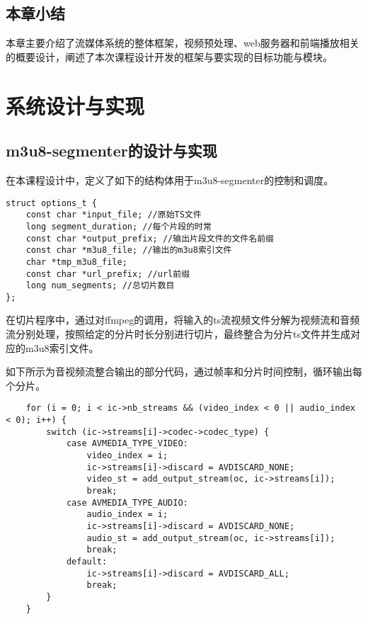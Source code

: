 \documentclass[bachelor]{thesis-uestc}
\begin{document}
\section{本章小结}
本章主要介绍了流媒体系统的整体框架，视频预处理、web服务器和前端播放相关的概要设计，阐述了本次课程设计开发的框架与要实现的目标功能与模块。



\chapter{系统设计与实现}

\section{m3u8-segmenter的设计与实现}

在本课程设计中，定义了如下的结构体用于m3u8-segmenter的控制和调度。

\begin{lstlisting}
struct options_t {
    const char *input_file; //原始TS文件
    long segment_duration; //每个片段的时常
    const char *output_prefix; //输出片段文件的文件名前缀
    const char *m3u8_file; //输出的m3u8索引文件
    char *tmp_m3u8_file; 
    const char *url_prefix; //url前缀
    long num_segments; //总切片数目
};
\end{lstlisting}

\par 在切片程序中，通过对ffmpeg的调用，将输入的ts流视频文件分解为视频流和音频流分别处理，按照给定的分片时长分别进行切片，最终整合为分片ts文件并生成对应的m3u8索引文件。

\par 如下所示为音视频流整合输出的部分代码，通过帧率和分片时间控制，循环输出每个分片。

\begin{lstlisting}
	for (i = 0; i < ic->nb_streams && (video_index < 0 || audio_index < 0); i++) {
        switch (ic->streams[i]->codec->codec_type) {
            case AVMEDIA_TYPE_VIDEO:
                video_index = i;
                ic->streams[i]->discard = AVDISCARD_NONE;
                video_st = add_output_stream(oc, ic->streams[i]);
                break;
            case AVMEDIA_TYPE_AUDIO:
                audio_index = i;
                ic->streams[i]->discard = AVDISCARD_NONE;
                audio_st = add_output_stream(oc, ic->streams[i]);
                break;
            default:
                ic->streams[i]->discard = AVDISCARD_ALL;
                break;
        }
    }
\end{lstlisting}
\end{document}
